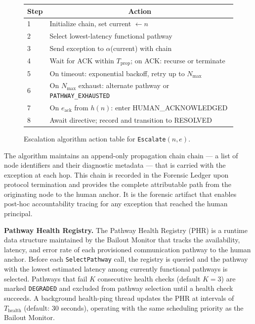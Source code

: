 \begin{figure}[htbp]
\centering
\small
\begin{tabular}{@{}ll@{}}
\toprule
Step & \multicolumn{1}{c}{Action} \\
\midrule
1 & Initialize chain, set current $\leftarrow n$ \\
2 & Select lowest-latency functional pathway \\
3 & Send exception to $\alpha$(current) with chain \\
4 & Wait for ACK within $T_{\text{prop}}$; on ACK: recurse or terminate \\
5 & On timeout: exponential backoff, retry up to $N_{\max}$ \\
6 & On $N_{\max}$ exhaust: alternate pathway or \texttt{PATHWAY\_EXHAUSTED} \\
7 & On $e_{\text{ack}}$ from $h(n)$: enter HUMAN\_ACKNOWLEDGED \\
8 & Await directive; record and transition to RESOLVED \\
\bottomrule
\end{tabular}
\caption{Escalation algorithm action table for \texttt{Escalate}$(n, e)$.}
\label{tab:escalate-actions}
\end{figure}

The algorithm maintains an append-only propagation chain $\text{chain}$ — a list of node identifiers and their diagnostic metadata — that is carried with the exception at each hop. This chain is recorded in the Forensic Ledger upon protocol termination and provides the complete attributable path from the originating node to the human anchor. It is the forensic artifact that enables post-hoc accountability tracing for any exception that reached the human principal.

\bigskip
\noindent\textbf{Pathway Health Registry.} The Pathway Health Registry (PHR) is a runtime data structure maintained by the Bailout Monitor that tracks the availability, latency, and error rate of each provisioned communication pathway to the human anchor. Before each \texttt{SelectPathway} call, the registry is queried and the pathway with the lowest estimated latency among currently functional pathways is selected. Pathways that fail $K$ consecutive health checks (default $K = 3$) are marked \texttt{DEGRADED} and excluded from pathway selection until a health check succeeds. A background health-ping thread updates the PHR at intervals of $T_{\text{health}}$ (default: 30 seconds), operating with the same scheduling priority as the Bailout Monitor.

